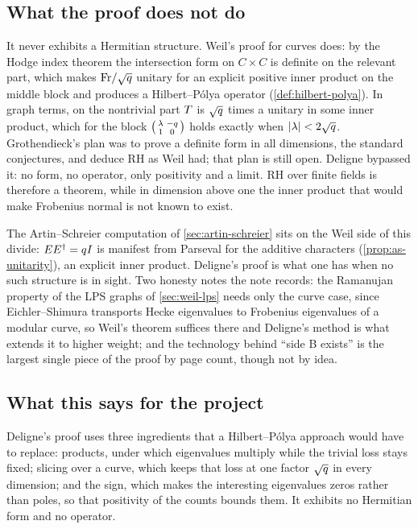 \subsection{What the proof does not do}

It never exhibits a Hermitian structure. Weil's proof for curves does: by the Hodge index theorem the
intersection form on $C\times C$ is definite on the relevant part, which makes $\mathrm{Fr}/\sqrt{q}$ unitary
for an explicit positive inner product on the middle block and produces a Hilbert--P\'olya operator
(\cref{def:hilbert-polya}). In graph terms, on the nontrivial part $T$ is $\sqrt{q}$ times a unitary
in some inner product, which for the block
$\left(\begin{smallmatrix}\lambda&-q\\1&0\end{smallmatrix}\right)$ holds exactly when $|\lambda| <
2\sqrt{q}$. Grothendieck's plan was to prove a definite form in all dimensions, the standard conjectures,
and deduce RH as Weil had; that plan is still open. Deligne bypassed it: no form, no operator, only
positivity and a limit. RH over finite fields is therefore a theorem, while in dimension above one the inner
product that would make Frobenius normal is not known to exist.

The Artin--Schreier computation of \cref{sec:artin-schreier} sits on the Weil side of this divide:
$EE^\dagger = q I$ is manifest from Parseval for the additive characters
(\cref{prop:as-unitarity}), an explicit inner product. Deligne's proof is what one has when no such
structure is in sight. Two honesty notes the note records: the Ramanujan property of the LPS graphs of
\cref{sec:weil-lps} needs only the curve case, since Eichler--Shimura transports Hecke eigenvalues to
Frobenius eigenvalues of a modular curve, so Weil's theorem suffices there and Deligne's method is what
extends it to higher weight; and the technology behind ``side B exists'' is the largest single piece of the
proof by page count, though not by idea.

\subsection{What this says for the project}

\begin{observation}
\label{obs:deligne-ingredients}
Deligne's proof uses three ingredients that a Hilbert--P\'olya approach would have to replace: products,
under which eigenvalues multiply while the trivial loss stays fixed; slicing over a curve, which keeps that
loss at one factor $\sqrt{q}$ in every dimension; and the sign, which makes the interesting eigenvalues
zeros rather than poles, so that positivity of the counts bounds them. It exhibits no Hermitian form and no
operator.
\end{observation}

